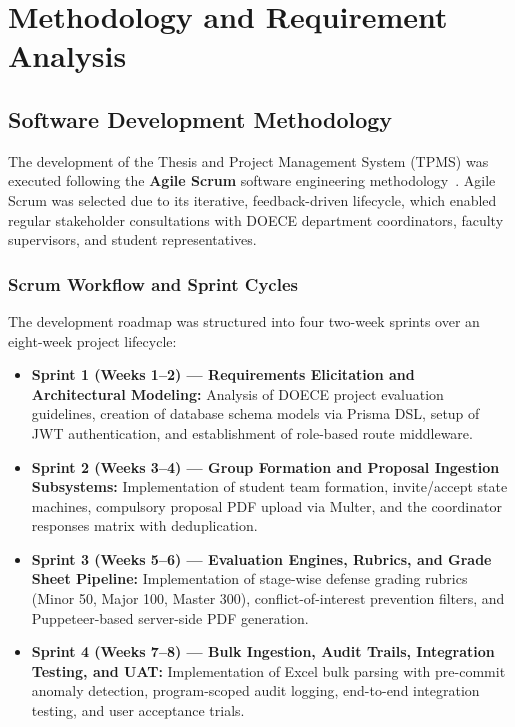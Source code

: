 \chapter{Methodology and Requirement Analysis}

\section{Software Development Methodology}
The development of the Thesis and Project Management System (TPMS) was executed following the \textbf{Agile Scrum} software engineering methodology~\citep{rubin2012scrum, pressman2015software}. Agile Scrum was selected due to its iterative, feedback-driven lifecycle, which enabled regular stakeholder consultations with DOECE department coordinators, faculty supervisors, and student representatives.

\subsection{Scrum Workflow and Sprint Cycles}
The development roadmap was structured into four two-week sprints over an eight-week project lifecycle:
\begin{itemize}
    \item \textbf{Sprint 1 (Weeks 1--2) --- Requirements Elicitation and Architectural Modeling:} Analysis of DOECE project evaluation guidelines, creation of database schema models via Prisma DSL, setup of JWT authentication, and establishment of role-based route middleware.
    \item \textbf{Sprint 2 (Weeks 3--4) --- Group Formation and Proposal Ingestion Subsystems:} Implementation of student team formation, invite/accept state machines, compulsory proposal PDF upload via Multer, and the coordinator responses matrix with deduplication.
    \item \textbf{Sprint 3 (Weeks 5--6) --- Evaluation Engines, Rubrics, and Grade Sheet Pipeline:} Implementation of stage-wise defense grading rubrics (Minor 50, Major 100, Master 300), conflict-of-interest prevention filters, and Puppeteer-based server-side PDF generation.
    \item \textbf{Sprint 4 (Weeks 7--8) --- Bulk Ingestion, Audit Trails, Integration Testing, and UAT:} Implementation of Excel bulk parsing with pre-commit anomaly detection, program-scoped audit logging, end-to-end integration testing, and user acceptance trials.
\end{itemize}

